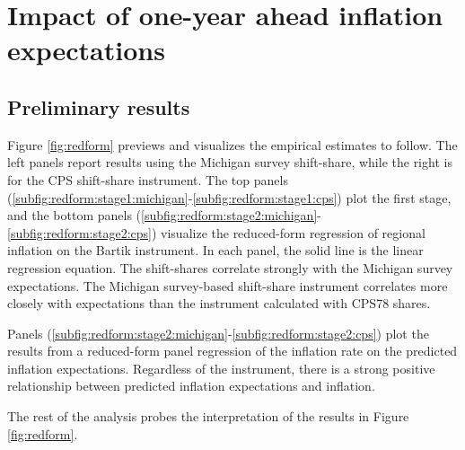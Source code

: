 \documentclass[12pt]{article}
\begin{document}
\section{Impact of one-year ahead inflation expectations}

\subsection{Preliminary results}

Figure \ref{fig:redform} previews and visualizes the empirical estimates to follow. The left panels report results using the Michigan survey shift-share, while the right is for the CPS shift-share instrument. The top panels (\ref{subfig:redform:stage1:michigan}-\ref{subfig:redform:stage1:cps}) plot the first stage, and the bottom panels (\ref{subfig:redform:stage2:michigan}-\ref{subfig:redform:stage2:cps}) visualize the reduced-form regression of regional inflation on the Bartik instrument. In each panel, the solid line is the linear regression equation. The shift-shares correlate strongly with the Michigan survey expectations. The Michigan survey-based shift-share instrument correlates more closely with expectations than the instrument calculated with CPS78 shares.  

Panels (\ref{subfig:redform:stage2:michigan}-\ref{subfig:redform:stage2:cps}) plot the results from a reduced-form panel regression of the inflation rate on the predicted inflation expectations. Regardless of the instrument, there is a strong positive relationship between predicted inflation expectations and inflation.

The rest of the analysis probes the interpretation of the results in Figure \ref{fig:redform}.
\end{document}
